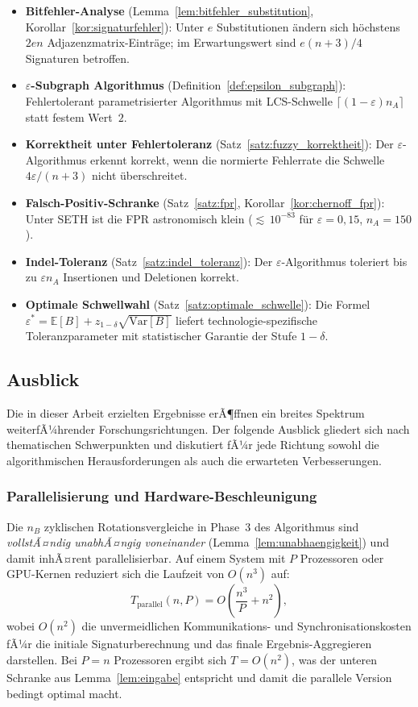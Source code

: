 ﻿\documentclass[a4paper,12pt]{article}
\theoremstyle{definition}
\begin{document}
\begin{itemize}
	Zuordnung aller Reads zu ihren Ursprungsorganismen.
	\item \textbf{Bitfehler-Analyse}
	(Lemma~\ref{lem:bitfehler_substitution},
	Korollar~\ref{kor:signaturfehler}):
	Unter $e$ Substitutionen \"{a}ndern sich h\"{o}chstens $2en$
	Adjazenzmatrix-Eintr\"{a}ge; im Erwartungswert sind
	$e(n+3)/4$ Signaturen betroffen.
	\item \textbf{$\varepsilon$-Subgraph Algorithmus}
	(Definition~\ref{def:epsilon_subgraph}):
	Fehlertolerant parametrisierter Algorithmus mit LCS-Schwelle
	$\lceil(1-\varepsilon)n_A\rceil$ statt festem Wert~$2$.
	\item \textbf{Korrektheit unter Fehlertoleranz}
	(Satz~\ref{satz:fuzzy_korrektheit}):
	Der $\varepsilon$-Algorithmus erkennt korrekt, wenn die normierte
	Fehlerrate die Schwelle $4\varepsilon/(n+3)$ nicht \"{u}berschreitet.
	\item \textbf{Falsch-Positiv-Schranke}
	(Satz~\ref{satz:fpr}, Korollar~\ref{kor:chernoff_fpr}):
	Unter SETH ist die FPR astronomisch klein (${\lesssim}\,10^{-83}$
	f\"{u}r $\varepsilon=0{,}15$, $n_A=150$).
	\item \textbf{Indel-Toleranz} (Satz~\ref{satz:indel_toleranz}):
	Der $\varepsilon$-Algorithmus toleriert bis zu $\varepsilon n_A$
	Insertionen und Deletionen korrekt.
	\item \textbf{Optimale Schwellwahl}
	(Satz~\ref{satz:optimale_schwelle}):
	Die Formel $\varepsilon^* = \mathbb{E}[B] + z_{1-\delta}\sqrt{\mathrm{Var}[B]}$
	liefert technologie-spezifische Toleranzparameter mit statistischer
	Garantie der Stufe $1-\delta$.
\end{itemize}

\subsection{Ausblick}
\label{subsec:ausblick}

Die in dieser Arbeit erzielten Ergebnisse erÃ¶ffnen ein breites Spektrum
weiterfÃ¼hrender Forschungsrichtungen. Der folgende Ausblick gliedert sich
nach thematischen Schwerpunkten und diskutiert fÃ¼r jede Richtung sowohl
die algorithmischen Herausforderungen als auch die erwarteten Verbesserungen.

\subsubsection{Parallelisierung und Hardware-Beschleunigung}

Die $n_B$ zyklischen Rotationsvergleiche in Phase~3 des Algorithmus sind
\textit{vollstÃ¤ndig unabhÃ¤ngig voneinander} (Lemma~\ref{lem:unabhaengigkeit})
und damit inhÃ¤rent parallelisierbar. Auf einem System mit $P$ Prozessoren
oder GPU-Kernen reduziert sich die Laufzeit von $O(n^3)$ auf:
\[
T_{\text{parallel}}(n, P) = O\!\left(\frac{n^3}{P} + n^2\right),
\]
wobei $O(n^2)$ die unvermeidlichen Kommunikations- und Synchronisationskosten
fÃ¼r die initiale Signaturberechnung und das finale Ergebnis-Aggregieren darstellen.
Bei $P = n$ Prozessoren ergibt sich $T = O(n^2)$, was der unteren Schranke aus
Lemma~\ref{lem:eingabe} entspricht und damit die parallele Version bedingt optimal
macht.
\end{document}
